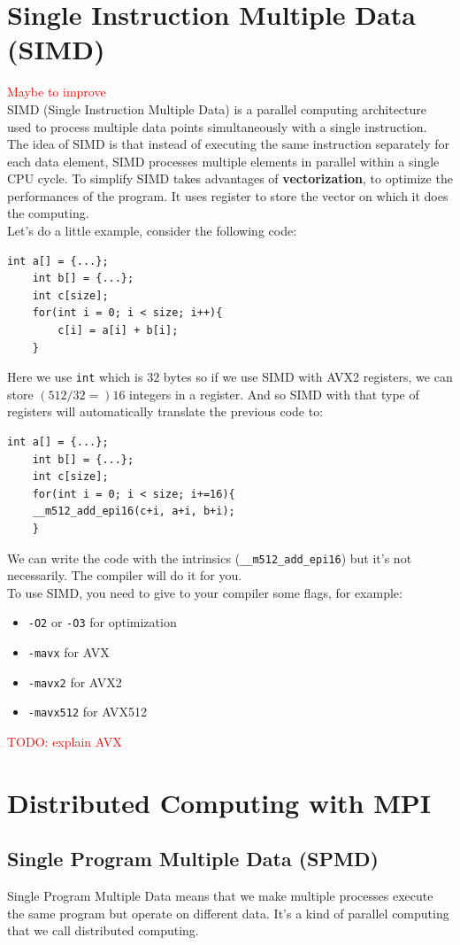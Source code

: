 \documentclass[12pt, openany]{report}
\theoremstyle{definition}
\newcommand{\code}[1]{\colorbox{light-gray}{\texttt{#1}}}
\begin{document}
\chapter{Single Instruction Multiple Data (SIMD)}
\textcolor{red}{Maybe to improve}\\
SIMD (Single Instruction Multiple Data) is a parallel computing architecture used to process multiple data points simultaneously with a single instruction.\\
The idea of SIMD is that instead of executing the same instruction separately for each data element, SIMD processes multiple elements in parallel within a single CPU cycle. To simplify SIMD takes advantages of \textbf{vectorization}, to optimize the performances of the program. It uses register to store the vector on which it does the computing.\\
Let's do a little example, consider the following code:
\begin{lstlisting}[style=CppStyle]
	int a[] = {...};
	int b[] = {...};
	int c[size];
	for(int i = 0; i < size; i++){
		c[i] = a[i] + b[i];
	}
\end{lstlisting}
Here we use \texttt{int} which is $32$ bytes so if we use SIMD with AVX2 registers, we can store $(512/32 =) 16$ integers in a register. And so SIMD with that type of registers will automatically translate the previous code to:
\begin{lstlisting}[style=CppStyle]
	int a[] = {...};
	int b[] = {...};
	int c[size];
	for(int i = 0; i < size; i+=16){
    __m512_add_epi16(c+i, a+i, b+i);
	}
\end{lstlisting}
We can write the code with the intrinsics (\code{\_\_m512\_add\_epi16}) but it's not necessarily. The compiler will do it for you.\\
To use SIMD, you need to give to your compiler some flags, for example:
\begin{itemize}
	\item \code{-O2} or \code{-O3} for optimization
	\item \code{-mavx} for AVX
	\item \code{-mavx2} for AVX2
	\item \code{-mavx512} for AVX512
\end{itemize}
\textcolor{red}{TODO: explain AVX}\\
\chapter{Distributed Computing with MPI}
\section{Single Program Multiple Data (SPMD)}
Single Program Multiple Data means that we make multiple processes execute the same program but operate on different data. It's a kind of parallel computing that we call distributed computing.
\end{document}
